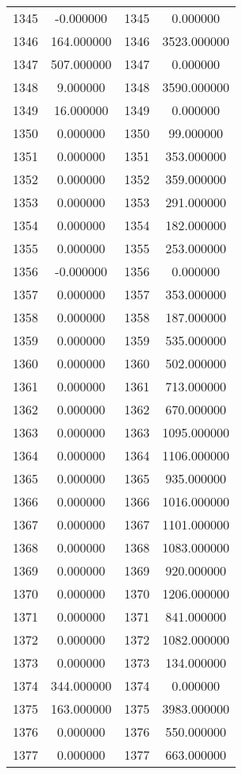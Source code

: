 \documentclass[12pt]{article}
\begin{document}
\begin{longtable}{@{}cccc@{}}
1345 & -0.000000 & 1345 & 0.000000 \\
1346 & 164.000000 & 1346 & 3523.000000 \\
1347 & 507.000000 & 1347 & 0.000000 \\
1348 & 9.000000 & 1348 & 3590.000000 \\
1349 & 16.000000 & 1349 & 0.000000 \\
1350 & 0.000000 & 1350 & 99.000000 \\
1351 & 0.000000 & 1351 & 353.000000 \\
1352 & 0.000000 & 1352 & 359.000000 \\
1353 & 0.000000 & 1353 & 291.000000 \\
1354 & 0.000000 & 1354 & 182.000000 \\
1355 & 0.000000 & 1355 & 253.000000 \\
1356 & -0.000000 & 1356 & 0.000000 \\
1357 & 0.000000 & 1357 & 353.000000 \\
1358 & 0.000000 & 1358 & 187.000000 \\
1359 & 0.000000 & 1359 & 535.000000 \\
1360 & 0.000000 & 1360 & 502.000000 \\
1361 & 0.000000 & 1361 & 713.000000 \\
1362 & 0.000000 & 1362 & 670.000000 \\
1363 & 0.000000 & 1363 & 1095.000000 \\
1364 & 0.000000 & 1364 & 1106.000000 \\
1365 & 0.000000 & 1365 & 935.000000 \\
1366 & 0.000000 & 1366 & 1016.000000 \\
1367 & 0.000000 & 1367 & 1101.000000 \\
1368 & 0.000000 & 1368 & 1083.000000 \\
1369 & 0.000000 & 1369 & 920.000000 \\
1370 & 0.000000 & 1370 & 1206.000000 \\
1371 & 0.000000 & 1371 & 841.000000 \\
1372 & 0.000000 & 1372 & 1082.000000 \\
1373 & 0.000000 & 1373 & 134.000000 \\
1374 & 344.000000 & 1374 & 0.000000 \\
1375 & 163.000000 & 1375 & 3983.000000 \\
1376 & 0.000000 & 1376 & 550.000000 \\
1377 & 0.000000 & 1377 & 663.000000 \\

\end{longtable}
\end{document}
